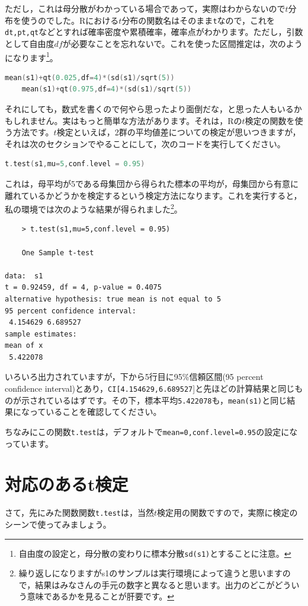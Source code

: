 \documentclass{ltjsbook}
\begin{document}
ただし，これは母分散がわかっている場合であって，実際はわからないので$t$分布を使うのでした。Rにおける$t$分布の関数名はそのまま\texttt{t}なので，これを\texttt{dt,pt,qt}などとすれば確率密度や累積確率，確率点がわかります。ただし，引数として自由度$df$が必要なことを忘れないで。これを使った区間推定は，次のようになります\footnote{自由度の設定と，母分散の変わりに標本分散\texttt{sd(s1)}とすることに注意。}。
\begin{lstlisting}[language=c++]
    mean(s1)+qt(0.025,df=4)*(sd(s1)/sqrt(5))
    mean(s1)+qt(0.975,df=4)*(sd(s1)/sqrt(5))
\end{lstlisting}
それにしても，数式を書くので何やら思ったより面倒だな，と思った人もいるかもしれません。実はもっと簡単な方法があります。それは，Rの$t$検定の関数を使う方法です。$t$検定といえば，2群の平均値差についての検定が思いつきますが，それは次のセクションでやることにして，次のコードを実行してください。
\begin{lstlisting}[language=c++]
    t.test(s1,mu=5,conf.level = 0.95)
\end{lstlisting}
これは，母平均が5である母集団から得られた標本の平均が，母集団から有意に離れているかどうかを検定するという検定方法になります。これを実行すると，私の環境では次のような結果が得られました\footnote{繰り返しになりますがs1のサンプルは実行環境によって違うと思いますので，結果はみなさんの手元の数字と異なると思います。出力のどこがどういう意味であるかを見ることが肝要です。}。
\begin{tcolorbox}
\begin{verbatim}
    > t.test(s1,mu=5,conf.level = 0.95)

	One Sample t-test

data:  s1
t = 0.92459, df = 4, p-value = 0.4075
alternative hypothesis: true mean is not equal to 5
95 percent confidence interval:
 4.154629 6.689527
sample estimates:
mean of x 
 5.422078\end{verbatim}
\end{tcolorbox}
いろいろ出力されていますが，下から5行目に95\%信頼区間(95 percent confidence interval)とあり，\texttt{CI[4.154629,6.689527}]と先ほどの計算結果と同じものが示されているはずです。その下，標本平均\texttt{5.422078}も，\texttt{mean(s1)}と同じ結果になっていることを確認してください。

ちなみにこの関数\texttt{t.test}は，デフォルトで\texttt{mean=0,conf.level=0.95}の設定になっています。

\section{対応のあるt検定}
さて，先にみた関数関数\texttt{t.test}は，当然$t$検定用の関数ですので，実際に検定のシーンで使ってみましょう。
\end{document}
